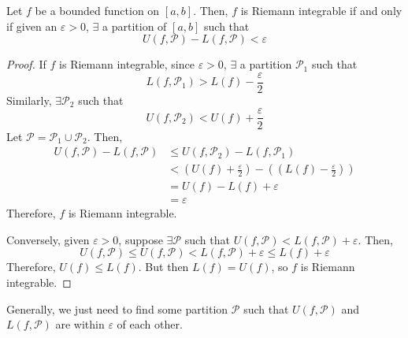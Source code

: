 \begin{theorem}
    Let $f$ be a bounded function on $[a, b]$. Then, $f$ is Riemann integrable if and only if given an $\varepsilon > 0$, $\exists$ a partition of $[a, b]$ such that $$U(f, \mathcal{P}) - L(f, \mathcal{P}) < \varepsilon$$
\end{theorem}
\begin{proof}
    If $f$ is Riemann integrable, since $\varepsilon > 0$, $\exists$ a partition $\mathcal{P}_1$ such that $$L(f, \mathcal{P}_1) > L(f) - \frac{\varepsilon}{2}$$
    Similarly, $\exists \mathcal{P}_2$ such that $$U(f, \mathcal{P}_2) < U(f) + \frac{\varepsilon}{2}$$
    Let $\mathcal{P} = \mathcal{P}_1 \cup \mathcal{P}_2$. Then,
    \begin{align*}
        U(f, \mathcal{P}) - L(f, \mathcal{P}) &\leq U(f, \mathcal{P}_2) - L(f, \mathcal{P}_1) \\
        &< \left(U(f) + \frac{\varepsilon}{2}\right) - \left((L(f) - \frac{\varepsilon}{2})\right) \\
        &= U(f) - L(f) + \varepsilon \\
        &= \varepsilon
    \end{align*}
    Therefore, $f$ is Riemann integrable.

    Conversely, given $\varepsilon > 0$, suppose $\exists \mathcal{P}$ such that $U(f, \mathcal{P}) < L(f, \mathcal{P}) + \varepsilon$. Then, $$U(f, \mathcal{P}) \leq U(f, \mathcal{P}) < L(f, \mathcal{P}) + \varepsilon \leq L(f) + \varepsilon$$
    Therefore, $U(f) \leq L(f)$. But then $L(f) = U(f)$, so $f$ is Riemann integrable.
\end{proof}
\begin{remark}
    Generally, we just need to find some partition $\mathcal{P}$ such that $U(f, \mathcal{P})$ and $L(f, \mathcal{P})$ are within $\varepsilon$ of each other.
\end{remark}


